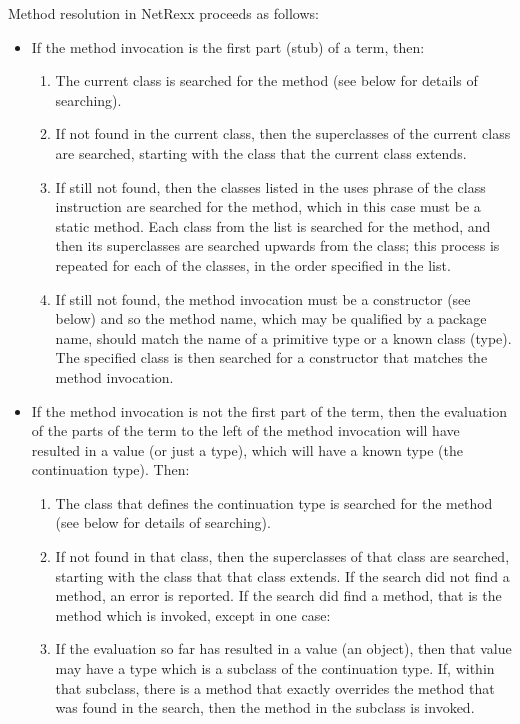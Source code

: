 Method resolution in NetRexx proceeds as follows:
\begin{itemize}
\item If the method invocation is the first part (stub) of a term, then:
  \begin{enumerate}
\item The current class is searched for the method (see below for details of searching).
\item If not found in the current class, then the superclasses of the current class are searched, starting with the class that the current class extends.
\item If still not found, then the classes listed in the uses phrase of the class instruction are searched for the method, which in this case must be a static method. Each class from the list is searched for the method, and then its superclasses are searched upwards from the class; this process is repeated for each of the classes, in the order specified in the list.
\item If still not found, the method invocation must be a constructor (see below) and so the method name, which may be qualified by a package name, should match the name of a primitive type or a known class (type). The specified class is then searched for a constructor that matches the method invocation.
\end{enumerate}
\item If the method invocation is not the first part of the term, then the evaluation of the parts of the term to the left of the method invocation will have resulted in a value (or just a type), which will have a known type (the continuation type). Then:
  \begin{enumerate}
  \item The class that defines the continuation type is searched for the method (see below for details of searching).
\item If not found in that class, then the superclasses of that class are searched, starting with the class that that class extends.
If the search did not find a method, an error is reported.
If the search did find a method, that is the method which is invoked, except in one case:
\item If the evaluation so far has resulted in a value (an object), then that value may have a type which is a subclass of the continuation type. If, within that subclass, there is a method that exactly overrides the method that was found in the search, then the method in the subclass is invoked.
\end{enumerate}
\end{itemize}
